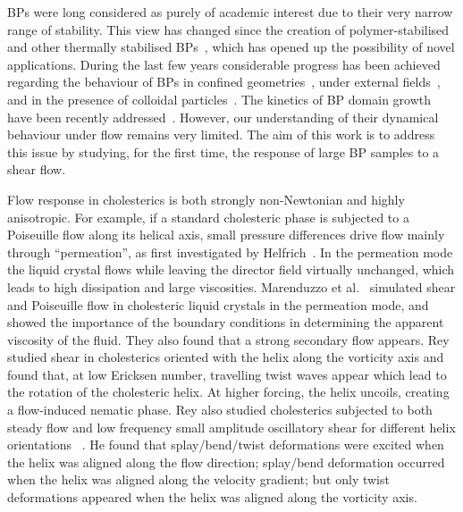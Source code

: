 \documentclass[8.5pt,twoside,twocolumn]{article}
\begin{document}
BPs were long considered as purely of academic interest due to their very narrow 
range of stability. This view has changed since the creation of polymer-stabilised and other thermally 
stabilised BPs~\cite{Kikuchi:2002,Coles:2005}, which has opened up the 
possibility of novel applications.
During the last few years considerable progress has been achieved regarding the behaviour 
of BPs in confined geometries~\cite{Fukuda:2010a, Fukuda:2010b, Ravnik:2011b}, under 
external fields~\cite{Alexander:2008,Fukuda:2009,Henrich:2010a,Castles:2010,Tiribocchi:2011a}, 
and in the presence of colloidal particles~\cite{Ravnik:2011a}.
The kinetics of BP domain growth have been recently addressed~\cite{Henrich:2010b}. 
However, our understanding of their dynamical behaviour under flow remains
very limited. The aim of this work is to address this issue by studying,
for the first time, the response of large BP samples to a shear flow.

Flow response in cholesterics is both strongly non-Newtonian and highly anisotropic.
For example, if a standard cholesteric phase is subjected to a Poiseuille flow along
its helical axis, small pressure differences drive flow mainly through
``permeation'', as first investigated by Helfrich~\cite{Helfrich:1969}.
In the permeation mode the liquid crystal flows while leaving the director
field virtually unchanged, which leads to high dissipation and large
viscosities. Marenduzzo et al.~\cite{Marenduzzo:2006a,Marenduzzo:2006b} simulated 
shear and Poiseuille flow in cholesteric liquid crystals in the permeation mode, and 
showed the importance of the boundary conditions in determining the apparent viscosity of the fluid. 
They also found that a strong secondary flow appears.
Rey~\cite{Rey:1996a, Rey:1996b} studied shear in cholesterics oriented with the helix along 
the vorticity axis and found that, at low Ericksen number, travelling twist waves appear which 
lead to the rotation of the cholesteric helix. At higher forcing, the helix uncoils, creating a flow-induced nematic phase.
Rey also studied cholesterics subjected to both steady flow and low frequency
small amplitude oscillatory shear for different helix orientations
~\cite{Rey:2000, Rey:2002}. He found that splay/bend/twist deformations were
excited when the helix was aligned along the flow direction; splay/bend
deformation occurred when the helix was aligned along the velocity gradient;
but only twist deformations
appeared when the helix was aligned along the vorticity axis.
\end{document}
